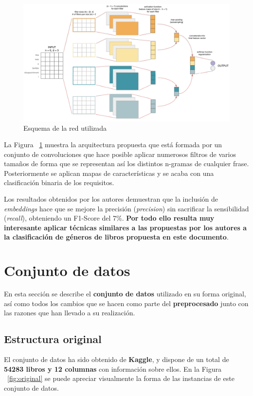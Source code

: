 \documentclass[12pt,a4paper, xcolor=table]{article}
\begin{document}
  \begin{figure}[!h]
    \centering
    \includegraphics[width=450px]{img/CNN Word2vect.png}
    \caption{Esquema de la red utilizada}
    \label{fig:esquemaRed}

  \end{figure}

\vspace{3mm}

La Figura ~\ref{fig:esquemaRed} muestra la arquitectura propuesta que está formada por un conjunto de convoluciones que hace posible aplicar numerosos filtros de varios tamaños de forma que se representan así los distintos n-gramas de cualquier frase. Posteriormente se aplican mapas de características y se acaba con una clasificación binaria de los requisitos.

\vspace{3mm}

Los resultados obtenidos por los autores demuestran que la inclusión de \textit{embeddings} hace que se mejore la precisión (\textit{precision}) sin sacrificar la sensibilidad (\textit{recall}), obteniendo un F1-Score del 7\%. \textbf{Por todo ello resulta muy interesante aplicar técnicas similares a las propuestas por los autores a la clasificación de géneros de libros propuesta en este documento}.

\newpage

\section{Conjunto de datos}
    En esta sección se describe el \textbf{conjunto de datos} utilizado en su forma original, así como todos los cambios que se hacen como parte del \textbf{preprocesado} junto con las razones que han llevado a su realización.

    \subsection{Estructura original}
    El conjunto de datos ha sido obtenido de \textbf{Kaggle}\cite{gbbe}, y dispone de un total de \textbf{54283 libros y 12 columnas} con información sobre ellos. En la Figura ~\ref{fig:original} se puede apreciar visualmente la forma de las instancias de este conjunto de datos.
\end{document}
